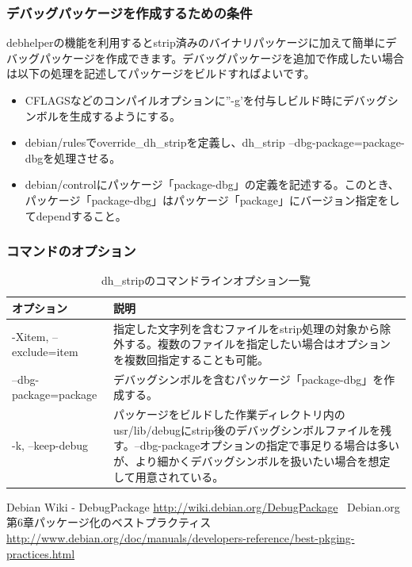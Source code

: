\documentclass[mingoth,a4paper]{jsarticle}
\begin{document}
\subsubsection{デバッグパッケージを作成するための条件}
debhelperの機能を利用するとstrip済みのバイナリパッケージに加えて簡単にデバッグパッケージを作成できます。デバッグパッケージを追加で作成したい場合は以下の処理を記述してパッケージをビルドすればよいです。

\begin{itemize}
 \item CFLAGSなどのコンパイルオプションに''-g'を付与しビルド時にデバッグシンボルを生成するようにする。
 \item debian/rulesでoverride\_dh\_stripを定義し、dh\_strip --dbg-package=package-dbgを処理させる。
 \item debian/controlにパッケージ「package-dbg」の定義を記述する。このとき、パッケージ「package-dbg」はパッケージ「package」にバージョン指定をしてdependすること。
\end{itemize}

\subsubsection{コマンドのオプション}

\begin{table}[ht]
\caption{dh\_stripのコマンドラインオプション一覧}
\begin{center}
\small
\begin{tabular}{|p{12em}|p{33em}|}
\hline
オプション&説明 \\
\hline
-Xitem, --exclude=item & 指定した文字列を含むファイルをstrip処理の対象から除外する。複数のファイルを指定したい場合はオプションを複数回指定することも可能。\\
\hline
--dbg-package=package & デバッグシンボルを含むパッケージ「package-dbg」を作成する。 \\
\hline
-k, --keep-debug & パッケージをビルドした作業ディレクトリ内のusr/lib/debugにstrip後のデバッグシンボルファイルを残す。--dbg-packageオプションの指定で事足りる場合は多いが、より細かくデバッグシンボルを扱いたい場合を想定して用意されている。 \\
\end{tabular}
\end{center}
\end{table}

\begin{thebibliography}{0}
 Debian Wiki - DebugPackage \url{http://wiki.debian.org/DebugPackage}\
 Debian.org 第6章パッケージ化のベストプラクティス \url{http://www.debian.org/doc/manuals/developers-reference/best-pkging-practices.html}
\end{thebibliography}
\end{document}
